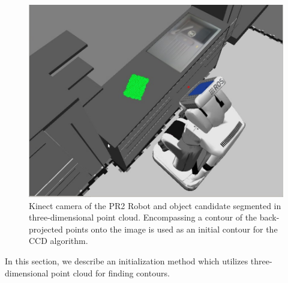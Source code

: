 \begin{figure}[htb]
  \centering
  \includegraphics[width=\linewidth]{images/pr2b.jpg}
  \caption[Kinect camera of the PR2 Robot and object candidate
  segmented in three-dimensional point cloud.]{Kinect camera of
    the PR2 Robot and object candidate segmented in three-dimensional point
    cloud. Encompassing a contour of the back-projected points onto
    the image is used as an initial contour for the CCD algorithm.}
  \label{fig:pointcloud}
\end{figure}


In this section, we describe an initialization method which utilizes three-dimensional
point cloud for finding contours.

